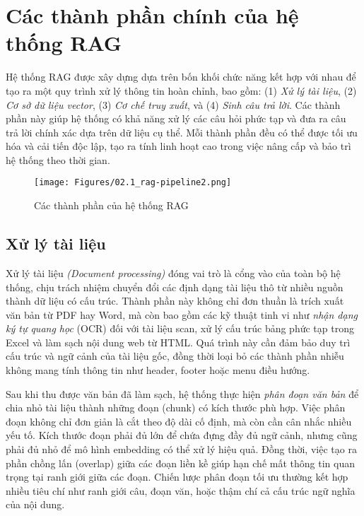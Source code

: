 \section{Các thành phần chính của hệ thống RAG}

Hệ thống RAG được xây dựng dựa trên bốn khối chức năng kết hợp với nhau để tạo ra một quy trình xử lý thông tin hoàn chỉnh, bao gồm: (1) \emph{Xử lý tài liệu}, (2) \emph{Cơ sở dữ liệu vector}, (3) \emph{Cơ chế truy xuất}, và (4) \emph{Sinh câu trả lời}. Các thành phần này giúp hệ thống có khả năng xử lý các câu hỏi phức tạp và đưa ra câu trả lời chính xác dựa trên dữ liệu cụ thể. Mỗi thành phần đều có thể được tối ưu hóa và cải tiến độc lập, tạo ra tính linh hoạt cao trong việc nâng cấp và bảo trì hệ thống theo thời gian.

\begin{figure}[H]
    \centering
    \texttt{[image: Figures/02.1\_rag-pipeline2.png]}
    \caption{Các thành phần của hệ thống RAG}
    \label{fig:rag-full}
\end{figure}

\subsection{Xử lý tài liệu}

{Xử lý tài liệu} \emph{(Document processing)} đóng vai trò là cổng vào của toàn bộ hệ thống, chịu trách nhiệm chuyển đổi các định dạng tài liệu thô từ nhiều nguồn thành dữ liệu có cấu trúc. Thành phần này không chỉ đơn thuần là trích xuất văn bản từ PDF hay Word, mà còn bao gồm các kỹ thuật tinh vi như \emph{nhận dạng ký tự quang học} (OCR) đối với tài liệu scan, xử lý cấu trúc bảng phức tạp trong Excel và làm sạch nội dung web từ HTML. Quá trình này cần đảm bảo duy trì cấu trúc và ngữ cảnh của tài liệu gốc, đồng thời loại bỏ các thành phần nhiễu không mang tính thông tin như header, footer hoặc menu điều hướng.

Sau khi thu được văn bản đã làm sạch, hệ thống thực hiện \emph{phân đoạn văn bản} để chia nhỏ tài liệu thành những đoạn (chunk) có kích thước phù hợp. Việc phân đoạn không chỉ đơn giản là cắt theo độ dài cố định, mà còn cần cân nhắc nhiều yếu tố. Kích thước đoạn phải đủ lớn để chứa đựng đầy đủ ngữ cảnh, nhưng cũng phải đủ nhỏ để mô hình embedding có thể xử lý hiệu quả. Đồng thời, việc tạo ra phần chồng lấn (overlap) giữa các đoạn liền kề giúp hạn chế mất thông tin quan trọng tại ranh giới giữa các đoạn. Chiến lược phân đoạn tối ưu thường kết hợp nhiều tiêu chí như ranh giới câu, đoạn văn, hoặc thậm chí cả cấu trúc ngữ nghĩa của nội dung.


